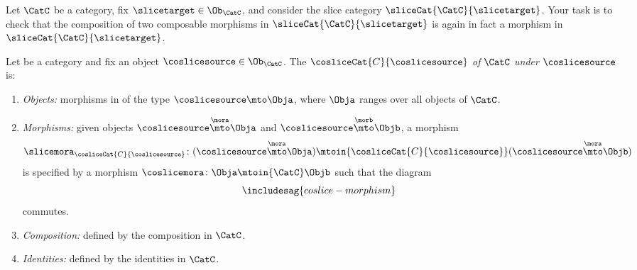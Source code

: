 \begin{gradedexercise}
    \label{ex:SliceCat}

    Let $\CatC$ be a category, fix $\slicetarget \in \Ob_{\CatC}$, and consider the slice category $\sliceCat{\CatC}{\slicetarget}$.
    Your task is to check that the composition of two composable morphisms in $\sliceCat{\CatC}{\slicetarget}$ is again in fact a morphism in $\sliceCat{\CatC}{\slicetarget}$.
\end{gradedexercise}


\begin{ctdefinition}
    \label{def:coslice-category}

    Let \CatC be a category and fix an object $\coslicesource \in \Ob_\CatC$.
    The  $\cosliceCat{C}{\coslicesource}$ \emph{of} $\CatC$ \emph{under} $\coslicesource$ is:
    \begin{enumerate}
        \item \emph{Objects:} morphisms in \CatC of the type $\coslicesource \mto \Obja$, where $\Obja$ ranges over all objects of $\CatC$.
        \item \emph{Morphisms:} given objects $\coslicesource \overset{\mora}{\mto} \Obja$ and $\coslicesource  \overset{\morb}{\mto} \Objb$, a morphism
              \begin{equation}
                  \slicemora_{\cosliceCat{C}{\coslicesource}} \colon (\coslicesource \overset{\mora}{\mto} \Obja)
                  \mtoin{\cosliceCat{C}{\coslicesource}}
                  (\coslicesource \overset{\mora}{\mto} \Objb)
              \end{equation}
              is specified by a morphism $\coslicemora \colon \Obja \mtoin{\CatC} \Objb$ such that the diagram
              \begin{equation}\label{eq:coslice-morphism}
                  \includesag{coslice-morphism}
              \end{equation}
              commutes.

        \item \emph{Composition:} defined by the composition in $\CatC$.
        \item \emph{Identities:} defined by the identities in $\CatC$.
    \end{enumerate}
\end{ctdefinition}


